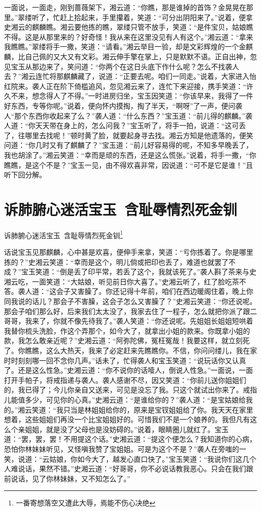 \documentclass[12pt,oneside]{book}
\begin{document}
一面说，一面走，刚到蔷薇架下，湘云道：“你瞧，那是谁掉的首饰？金晃晃在那里。”翠缕听了，忙赶上拾起来，手里攥着，笑道：“可分出阴阳来了。”说着，便拿史湘云的麒麟瞧。湘云要他拣的瞧，翠缕只管不放手，笑道：“是件宝贝，姑娘瞧不得。这是从那里来的？好奇怪！我从来在这里没见有人有这个。”湘云道：“拿来我瞧瞧。”翠缕将手一撒，笑道：“请看。”湘云举目一验，却是文彩辉煌的一个金麒麟，比自己佩的又大又有文彩。湘云伸手擎在掌上，只是默默不语。正自出神，忽见宝玉从那边来了，笑问道：“你两个在这日头底下作什么呢？怎么不找袭人去？”湘云连忙将那麒麟藏了，说道：“正要去呢。咱们一同走。”说着，大家进入怡红院来。袭人正在阶下倚槛追风，忽见湘云来了，连忙下来迎接，携手笑道：“许久不来，想念得人了不得。”一时进房归坐，宝玉因笑道：“你该早来，我得了一件好东西，专等你呢。”说着，便向怀内摸掏，掏了半天，“啊呀”了一声，便问袭人“那个东西你收起来了么？”袭人道：“什么东西？”宝玉道：“前儿得的麒麟。”袭人道：“你天天带在身上的，怎么问我？”宝玉听了，将手一拍，说道：“这可丢了，往哪里去找呢！”顿时黄了脸，就要起身寻去找。湘云方知是他遗落的，便笑问道：“你几时又有了麒麟了？”宝玉道：“前儿好容易得的呢，不知多早晚丢了，我也胡涂了。”湘云笑道：“幸而是顽的东西，还是这么慌张。”说着，将手一撒，“你瞧瞧，是这个不是？”宝玉一见，由不得欢喜非常，因说道：“可不是它是谁！”且听下回分解。
 

\chapter{诉肺腑心迷活宝玉~含耻辱情烈死金钏}
诉肺腑心迷活宝玉~含耻辱情烈死金钏\footnote{一番寄想落空又遭此大辱，焉能不伤心决绝}

话说宝玉见那麒麟，心中甚是欢喜，便伸手来拿，笑道：“亏你拣着了。你是哪里拣的？”史湘云笑道：“幸而是这个，明儿倘或把印也丢了，难道也就罢了不成？”宝玉笑道：“倒是丢了印平常，若丢了这个，我就该死了。”袭人斟了茶来与史湘云吃，一面笑道：“大姑娘，听见前日你大喜了。”史湘云听了，红了脸吃茶不答。袭人道：“这会子又害臊了。你还记得十年前，咱们在西边暖阁住着，晚上你同我说的话儿？那会子不害臊，这会子怎么又害臊了？”史湘云笑道：“你还说呢。那会子咱们那么好，后来我们太太没了，我家去住了一程子，怎么就把你派了跟二哥哥，我来了，你就不像先待我了。”袭人笑道：“你还说呢。先姐姐长姐姐短哄着我替你梳头洗脸，作这个弄那个，如今大了，就拿出小姐的款来。你既拿小姐的款，我怎么敢亲近呢？”史湘云道：“阿弥陀佛，冤枉冤哉！我要这样，就立刻死了。你瞧瞧，这么大热天，我来了必定赶来先瞧瞧你。不信，你问问缕儿，我在家时时刻刻哪一回不念你几声。”话未了，忙得袭人和宝玉笑道：“说玩话你又认真了。还是这么性急。”史湘云道：“你不说你的话噎人，倒说人性急。”一面说，一面打开手帕子，将戒指递与袭人。袭人感谢不尽，因又笑道：“你前儿送你姐姐们的，我已得了；今儿你亲自又送来，可见是没忘了我。只这个就试出你来了。戒指儿能值多少，可见你的心真。”史湘云道：“是谁给你的？”袭人道：“是宝姑娘给我的。”湘云笑道：“我只当是林姐姐给你的，原来是宝钗姐姐给了你。我天天在家里想着，这些姐姐们再没一个比宝姐姐好的。可惜我们不是一个娘养的。我但凡有这么个亲姐姐，就是没了父母也是没妨碍的。”说着，眼睛圈儿就红了。宝玉道：“罢，罢，罢！不用提这个话。”史湘云道：“提这个便怎么？我知道你的心病，恐怕你林妹妹听见，又怪嗔我赞了宝姐姐。可是为这个不是？”袭人在旁嗤的一笑，说道：“云姑娘，你如今大了，越发心直口快了。”宝玉笑道：“我说你们这几个人难说话，果然不错。”史湘云道：“好哥哥，你不必说话教我恶心。只会在我们跟前说话，见了你林妹妹，又不知怎么了。”
\end{document}
